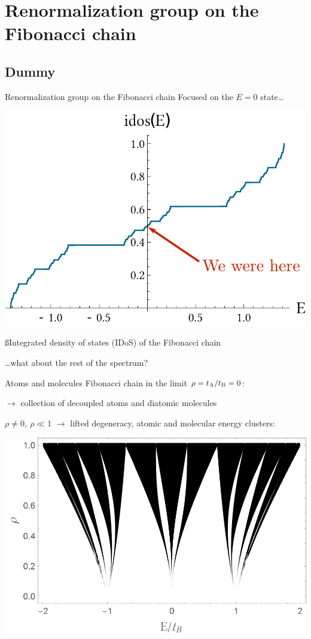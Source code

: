 \section{Renormalization group on the Fibonacci chain}
\subsection{Dummy}

\begin{frame}{Renormalization group on the Fibonacci chain}
Focused on the $E=0$ state\dots

{\centering
\includegraphics[width=.5\textwidth]{img/3_part2/idos_fibo}

{\ss Integrated density of states (IDoS) of the Fibonacci chain}

}

\dots what about the rest of the spectrum?
\end{frame}

\begin{frame}{Atoms and molecules}
Fibonacci chain in the limit $\rho = t_{\text{A}}/t_{\text{B}} = 0$:

{\centering


}

$\to$ collection of decoupled atoms and diatomic molecules

$\rho \neq 0,~\rho \ll 1$ $\to$ lifted degeneracy, atomic and molecular energy clusters:

{\centering
\includegraphics[width=.4\textwidth]{img/3_part2/fibonacci_spectra_varying_rho}

}

\end{frame}

